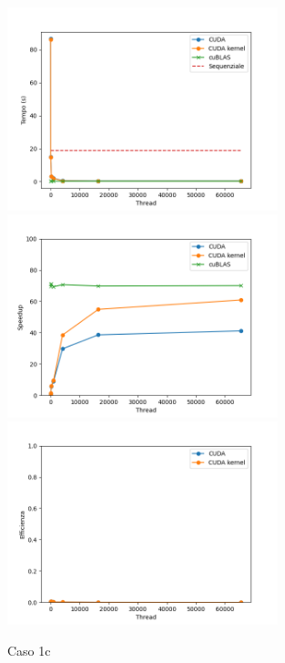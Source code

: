 \begin{figure}[ht]
    \centering
    \includegraphics[width=0.7\textwidth]{./imgs/graphs/caso_a2.png}
    \includegraphics[width=0.7\textwidth]{./imgs/graphs/caso_a2_speedup.png}
    \includegraphics[width=0.7\textwidth]{./imgs/graphs/caso_a2_efficiency.png}
    \caption{Caso 1c}
\end{figure}

